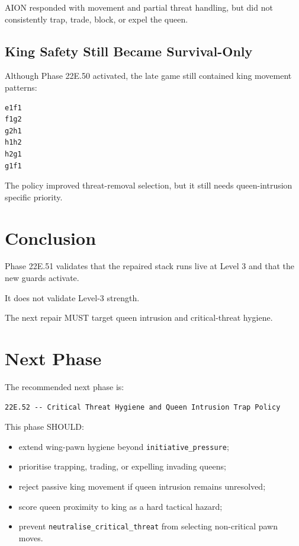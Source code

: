 \documentclass[11pt,a4paper]{article}
\begin{document}
AION responded with movement and partial threat handling, but did not consistently trap, trade, block, or expel the queen.

\subsection{King Safety Still Became Survival-Only}

Although Phase 22E.50 activated, the late game still contained king movement patterns:

\begin{verbatim}
e1f1
f1g2
g2h1
h1h2
h2g1
g1f1
\end{verbatim}

The policy improved threat-removal selection, but it still needs queen-intrusion specific priority.

\section{Conclusion}

Phase 22E.51 validates that the repaired stack runs live at Level 3 and that the new guards activate.

It does not validate Level-3 strength.

The next repair MUST target queen intrusion and critical-threat hygiene.

\section{Next Phase}

The recommended next phase is:

\begin{verbatim}
22E.52 -- Critical Threat Hygiene and Queen Intrusion Trap Policy
\end{verbatim}

This phase SHOULD:

\begin{itemize}
  \item extend wing-pawn hygiene beyond \texttt{initiative\_pressure};
  \item prioritise trapping, trading, or expelling invading queens;
  \item reject passive king movement if queen intrusion remains unresolved;
  \item score queen proximity to king as a hard tactical hazard;
  \item prevent \texttt{neutralise\_critical\_threat} from selecting non-critical pawn moves.
\end{itemize}
\end{document}
